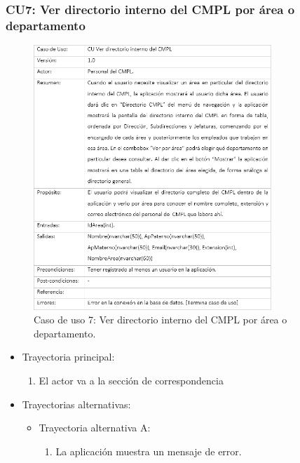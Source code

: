 		\subsubsection{CU7: Ver directorio interno del CMPL por área o departamento}
			\begin{figure}[htbp!]
				\centering
					\includegraphics[width=0.8\textwidth]{images/CU/CU7}
					\caption{Caso de uso 7: Ver directorio interno del CMPL por área o departamento.}
				\label{Tabla}
			\end{figure}
			
			\begin{itemize}
				\item Trayectoria principal:
					\begin{enumerate}
						\item El actor va a la sección de correspondencia 
					\end{enumerate}
				\item Trayectorias alternativas:
					\begin{itemize}
						\item Trayectoria alternativa A:
							\begin{enumerate}
								\item La aplicación muestra un mensaje de error.
							\end{enumerate}
					\end{itemize}
			\end{itemize}
			
